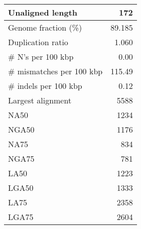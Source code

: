 \documentclass[12pt,a4paper]{article}
\begin{document}
\begin{table}[ht]
\begin{center}
\begin{tabular}{|l*{1}{|r}|}
Unaligned length & 172 \\ \hline
Genome fraction (\%) & 89.185 \\ \hline
Duplication ratio & 1.060 \\ \hline
\# N's per 100 kbp & 0.00 \\ \hline
\# mismatches per 100 kbp & 115.49 \\ \hline
\# indels per 100 kbp & 0.12 \\ \hline
Largest alignment & 5588 \\ \hline
NA50 & 1234 \\ \hline
NGA50 & 1176 \\ \hline
NA75 & 834 \\ \hline
NGA75 & 781 \\ \hline
LA50 & 1223 \\ \hline
LGA50 & 1333 \\ \hline
LA75 & 2358 \\ \hline
LGA75 & 2604 \\ \hline
\end{tabular}
\end{center}
\end{table}
\end{document}
